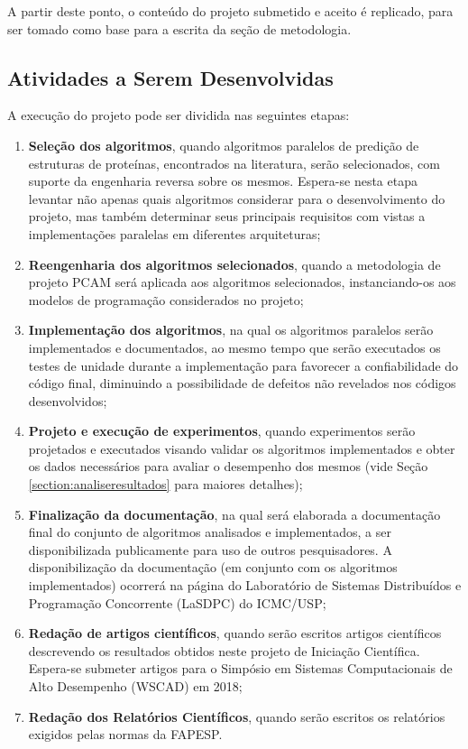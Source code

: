 
A partir deste ponto, o conteúdo do projeto submetido e aceito é replicado, para ser tomado como base para a escrita da seção de metodologia.

\subsection{Atividades a Serem Desenvolvidas}
\label{section:atividadesdesenvolvidas}

A execução do projeto pode ser dividida nas seguintes etapas:

\begin{enumerate}
    \item \textbf{Seleção dos algoritmos}, quando algoritmos paralelos de predição de estruturas de proteínas, encontrados na literatura, serão selecionados, com suporte da engenharia reversa sobre os mesmos. Espera-se nesta etapa levantar não apenas quais algoritmos considerar para o desenvolvimento do projeto, mas também determinar seus principais requisitos com vistas a implementações paralelas em diferentes arquiteturas;
    
    \item \textbf{Reengenharia dos algoritmos selecionados}, quando a metodologia de projeto PCAM será aplicada aos algoritmos selecionados, instanciando-os aos modelos de programação considerados no projeto;
    
    \item \textbf{Implementação dos algoritmos}, na qual os algoritmos paralelos serão implementados e documentados, ao mesmo tempo que serão executados os testes de unidade durante a implementação para favorecer a confiabilidade do código final, diminuindo a possibilidade de defeitos não revelados nos códigos desenvolvidos;
    
    \item \textbf{Projeto e execução de experimentos}, quando experimentos serão projetados e executados visando validar os algoritmos implementados e obter os dados necessários para avaliar o desempenho dos mesmos (vide Seção \ref{section:analiseresultados} para maiores detalhes);

    \item \textbf{Finalização da documentação}, na qual será elaborada a documentação final do conjunto de algoritmos analisados e implementados, a ser disponibilizada publicamente para uso de outros pesquisadores. A disponibilização da documentação (em conjunto com os algoritmos implementados) ocorrerá na página do Laboratório de Sistemas Distribuídos e Programação Concorrente (LaSDPC) do ICMC/USP;
    
    \item \textbf{Redação de artigos científicos}, quando serão escritos artigos científicos descrevendo os resultados obtidos neste projeto de Iniciação Científica. Espera-se submeter artigos para o Simpósio em Sistemas Computacionais de Alto Desempenho (WSCAD) em 2018;
    
    \item \textbf{Redação dos Relatórios Científicos}, quando serão escritos os relatórios exigidos pelas normas da FAPESP.
    
\end{enumerate}

